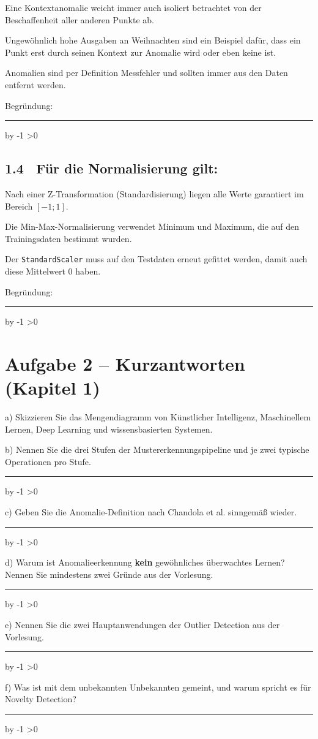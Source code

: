 \documentclass[10pt,a4paper]{article}
\newcommand{\mcbox}{\raisebox{-1pt}{\fbox{\rule{0pt}{7pt}\rule{7pt}{0pt}}}\hspace{6pt}}
\newcommand{\antwortlinien}[1]{%
  \par\vspace{2pt}%
  \newcount\zeilen \zeilen=#1
  \loop
    \noindent\rule{\linewidth}{0.4pt}\par\vspace{11pt}%
    \advance\zeilen by -1
  \ifnum\zeilen>0 \repeat
}
\begin{document}
\mcbox Eine Kontextanomalie weicht immer auch isoliert betrachtet von der Beschaffenheit aller
anderen Punkte ab.

\mcbox Ungewöhnlich hohe Ausgaben an Weihnachten sind ein Beispiel dafür, dass ein Punkt erst
durch seinen Kontext zur Anomalie wird oder eben keine ist.

\mcbox Anomalien sind per Definition Messfehler und sollten immer aus den Daten entfernt werden.

Begründung:
\antwortlinien{2}

\subsection*{1.4 \ Für die Normalisierung gilt:}

\mcbox Nach einer Z-Transformation (Standardisierung) liegen alle Werte garantiert im
Bereich $[-1;1]$.

\mcbox Die Min-Max-Normalisierung verwendet Minimum und Maximum, die auf den Trainingsdaten
bestimmt wurden.

\mcbox Der \texttt{StandardScaler} muss auf den Testdaten erneut gefittet werden, damit auch
diese Mittelwert 0 haben.

Begründung:
\antwortlinien{2}

\section*{Aufgabe 2 -- Kurzantworten (Kapitel 1)}

\Needspace*{6cm}
a) Skizzieren Sie das Mengendiagramm von Künstlicher Intelligenz, Maschinellem Lernen,
Deep Learning und wissensbasierten Systemen.

\vspace{4cm}

b) Nennen Sie die drei Stufen der Mustererkennungspipeline und je zwei typische Operationen
pro Stufe.
\antwortlinien{4}

c) Geben Sie die Anomalie-Definition nach Chandola et al. sinngemäß wieder.
\antwortlinien{2}

d) Warum ist Anomalieerkennung \textbf{kein} gewöhnliches überwachtes Lernen?
Nennen Sie mindestens zwei Gründe aus der Vorlesung.
\antwortlinien{3}

e) Nennen Sie die zwei Hauptanwendungen der Outlier Detection aus der Vorlesung.
\antwortlinien{2}

f) Was ist mit dem \glqq unbekannten Unbekannten\grqq{} gemeint, und warum spricht es für
Novelty Detection?
\antwortlinien{3}
\end{document}
